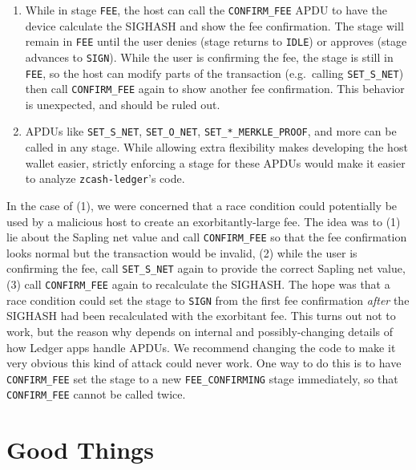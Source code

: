 \documentclass[10pt,titlepage]{article}
\begin{document}
\begin{enumerate}
      \item While in stage \texttt{FEE}, the host can call the
      \texttt{CONFIRM\_FEE} APDU to have the device calculate the SIGHASH and
      show the fee confirmation. The stage will remain in \texttt{FEE} until the
      user denies (stage returns to \texttt{IDLE}) or approves (stage advances
      to \texttt{SIGN}). While the user is confirming the fee, the stage is
      still in \texttt{FEE}, so the host can modify parts of the transaction
      (e.g.\ calling \texttt{SET\_S\_NET}) then call \texttt{CONFIRM\_FEE} again
      to show another fee confirmation. This behavior is unexpected, and should
      be ruled out.
      \item APDUs like \texttt{SET\_S\_NET}, \texttt{SET\_O\_NET},
      \texttt{SET\_*\_MERKLE\_PROOF}, and more can be called in any stage. While
      allowing extra flexibility makes developing the host wallet easier,
      strictly enforcing a stage for these APDUs would make it easier to analyze
      \texttt{zcash-ledger}'s code.
\end{enumerate}

In the case of (1), we were concerned that a race condition could potentially be
used by a malicious host to create an exorbitantly-large fee. The idea was to
(1) lie about the Sapling net value and call \texttt{CONFIRM\_FEE} so that the
fee confirmation looks normal but the transaction would be invalid, (2) while
the user is confirming the fee, call \texttt{SET\_S\_NET} again to provide the
correct Sapling net value, (3) call \texttt{CONFIRM\_FEE} again to recalculate
the SIGHASH. The hope was that a race condition could set the stage to
\texttt{SIGN} from the first fee confirmation \emph{after} the SIGHASH had been
recalculated with the exorbitant fee. This turns out not to work, but the reason
why depends on internal and possibly-changing details of how Ledger apps handle
APDUs. We recommend changing the code to make it very obvious this kind of
attack could never work. One way to do this is to have \texttt{CONFIRM\_FEE} set
the stage to a new \texttt{FEE\_CONFIRMING} stage immediately, so that
\texttt{CONFIRM\_FEE} cannot be called twice.

\section{Good Things} \label{secgoodthings}
\end{document}
